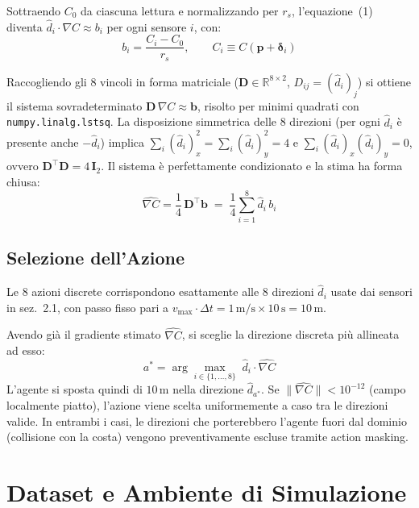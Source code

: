 \documentclass[12pt, a4paper]{article}
\begin{document}
Sottraendo $C_0$ da ciascuna lettura e normalizzando per $r_s$, l'equazione~(1)
diventa $\hat{d}_i \cdot \nabla C \approx b_i$ per ogni sensore $i$, con:
\begin{equation}
    b_i = \frac{C_i - C_0}{r_s}, \qquad C_i \equiv C(\mathbf{p}+\boldsymbol{\delta}_i)
\end{equation}

Raccogliendo gli 8 vincoli in forma matriciale ($\mathbf{D} \in \mathbb{R}^{8 \times 2}$,
$D_{ij} = (\hat{d}_i)_j$) si ottiene il sistema sovradeterminato
$\mathbf{D}\,\nabla C \approx \mathbf{b}$, risolto per minimi quadrati con
\texttt{numpy.linalg.lstsq}. La disposizione simmetrica delle 8 direzioni
(per ogni $\hat{d}_i$ \`e presente anche $-\hat{d}_i$) implica
$\sum_i (\hat{d}_i)_x^2 = \sum_i (\hat{d}_i)_y^2 = 4$ e
$\sum_i (\hat{d}_i)_x(\hat{d}_i)_y = 0$, ovvero
$\mathbf{D}^\top\mathbf{D} = 4\,\mathbf{I}_2$.
Il sistema \`e perfettamente condizionato e la stima ha forma chiusa:
\begin{equation}
    \hat{\nabla C} = \frac{1}{4}\,\mathbf{D}^\top\mathbf{b}
    \;=\; \frac{1}{4}\sum_{i=1}^{8} \hat{d}_i\,b_i
\end{equation}

\subsection{Selezione dell'Azione}

Le 8 azioni discrete corrispondono esattamente alle 8 direzioni $\hat{d}_i$ usate
dai sensori in sez.~2.1, con passo fisso pari a
$v_{\max} \cdot \Delta t = 1\,\text{m/s} \times 10\,\text{s} = 10\,\text{m}$.

Avendo già il gradiente stimato $\hat{\nabla C}$, si sceglie la direzione
discreta pi\`u allineata ad esso:
\begin{equation}
    a^* = \arg\max_{i \in \{1,\ldots,8\}} \; \hat{d}_i \cdot \hat{\nabla C}
\end{equation}
L'agente si sposta quindi di $10\,\text{m}$ nella direzione $\hat{d}_{a^*}$.
Se $\|\hat{\nabla C}\| < 10^{-12}$ (campo localmente piatto),
l'azione viene scelta uniformemente a caso tra le direzioni valide.
In entrambi i casi, le direzioni che porterebbero l'agente fuori dal dominio
(collisione con la costa) vengono preventivamente escluse tramite action masking.

\section{Dataset e Ambiente di Simulazione}
\end{document}
